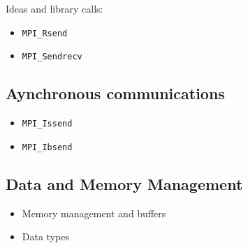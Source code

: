 Ideas and library calls: \\
\begin{itemize}
\item \texttt{MPI\_Rsend}
\item \texttt{MPI\_Sendrecv}
\end{itemize}

\subsection{Aynchronous communications}

\begin{itemize}
\item \texttt{MPI\_Issend}
\item \texttt{MPI\_Ibsend}
\end{itemize}

\subsection{Data and Memory Management}

\begin{itemize}
\item Memory management and buffers
\item Data types
\end{itemize}


